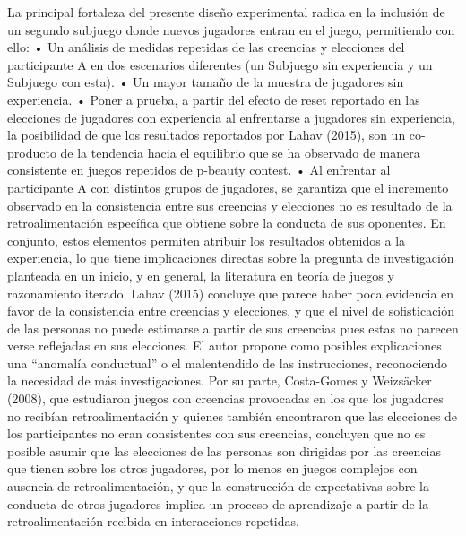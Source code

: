 La principal fortaleza del presente diseño experimental radica en la inclusión de un segundo subjuego donde nuevos jugadores entran en el juego, permitiendo con ello:
•	Un análisis de medidas repetidas de las creencias y elecciones del participante A en dos escenarios diferentes (un Subjuego sin experiencia y un Subjuego con esta).
•	Un mayor tamaño de la muestra de jugadores sin experiencia.
•	Poner a prueba, a partir del efecto de reset reportado en las elecciones de jugadores con experiencia al enfrentarse a jugadores sin experiencia, la posibilidad de que los resultados reportados por Lahav (2015), son un co-producto de la tendencia hacia el equilibrio que se ha observado de manera consistente en juegos repetidos de p-beauty contest.
•	Al enfrentar al participante A con distintos grupos de jugadores, se garantiza que el incremento observado en la consistencia entre sus creencias y elecciones no es resultado de la retroalimentación específica que obtiene sobre la conducta de sus oponentes.
En conjunto, estos elementos permiten atribuir los resultados obtenidos a la experiencia, lo que tiene implicaciones directas sobre la pregunta de investigación planteada en un inicio, y en general, la literatura en teoría de juegos y razonamiento iterado.
Lahav (2015) concluye que parece haber poca evidencia en favor de la consistencia entre creencias y elecciones, y que el nivel de sofisticación de las personas no puede estimarse a partir de sus creencias pues estas no parecen verse reflejadas en sus elecciones. El autor propone como posibles explicaciones una “anomalía conductual” o el malentendido de las instrucciones, reconociendo la necesidad de más investigaciones. Por su parte, Costa-Gomes y Weizsäcker (2008), que estudiaron juegos con creencias provocadas en los que los jugadores no recibían retroalimentación y quienes también encontraron que las elecciones de los participantes no eran consistentes con sus creencias, concluyen que no es posible asumir que las elecciones de las personas son dirigidas por las creencias que tienen sobre los otros jugadores, por lo menos en juegos complejos con ausencia de retroalimentación, y que la construcción de expectativas sobre la conducta de otros jugadores implica un proceso de aprendizaje a partir de la retroalimentación recibida en interacciones repetidas.

